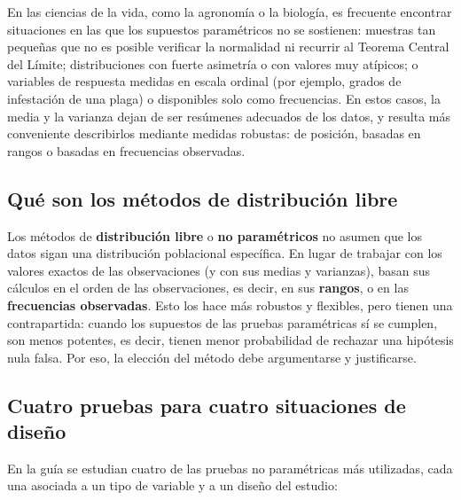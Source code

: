 \documentclass[
  spanish,
  letterpaper,
  DIV=11,
  numbers=noendperiod]{scrreprt}
\begin{document}
En las ciencias de la vida, como la agronomía o la biología, es
frecuente encontrar situaciones en las que los supuestos paramétricos no
se sostienen: muestras tan pequeñas que no es posible verificar la
normalidad ni recurrir al Teorema Central del Límite; distribuciones con
fuerte asimetría o con valores muy atípicos; o variables de respuesta
medidas en escala ordinal (por ejemplo, grados de infestación de una
plaga) o disponibles solo como frecuencias. En estos casos, la media y
la varianza dejan de ser resúmenes adecuados de los datos, y resulta más
conveniente describirlos mediante medidas robustas: de posición, basadas
en rangos o basadas en frecuencias observadas.

\subsection{Qué son los métodos de distribución
libre}\label{quuxe9-son-los-muxe9todos-de-distribuciuxf3n-libre}

Los métodos de \textbf{distribución libre} o \textbf{no paramétricos} no
asumen que los datos sigan una distribución poblacional específica. En
lugar de trabajar con los valores exactos de las observaciones (y con
sus medias y varianzas), basan sus cálculos en el orden de las
observaciones, es decir, en sus \textbf{rangos}, o en las
\textbf{frecuencias observadas}. Esto los hace más robustos y flexibles,
pero tienen una contrapartida: cuando los supuestos de las pruebas
paramétricas sí se cumplen, son menos potentes, es decir, tienen menor
probabilidad de rechazar una hipótesis nula falsa. Por eso, la elección
del método debe argumentarse y justificarse.

\subsection{Cuatro pruebas para cuatro situaciones de
diseño}\label{cuatro-pruebas-para-cuatro-situaciones-de-diseuxf1o}

En la guía se estudian cuatro de las pruebas no paramétricas más
utilizadas, cada una asociada a un tipo de variable y a un diseño del
estudio:
\end{document}
